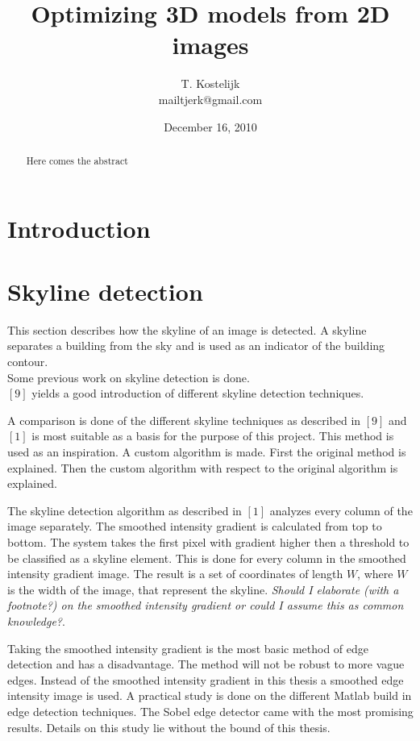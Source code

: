 \documentclass[10pt]{article}
\title{\sc Optimizing 3D models from 2D images}
\author{T. Kostelijk\\mailtjerk@gmail.com}
\date{December 16, 2010}
\begin{document}
\maketitle
\begin{abstract}
Here comes the abstract
\end{abstract}

\section{Introduction}

\section{Skyline detection}
This section describes how the skyline of an image is detected. A skyline
separates a building from the sky and is used as an indicator of the building contour.
\\

Some previous work on skyline detection is done.\\
$[9]$ yields a good introduction of different skyline detection techniques.

A comparison is done of the different skyline techniques as described in $[9]$
and $[1]$ is most suitable as a basis for the purpose of this project.  This
method is used as an inspiration. A custom algorithm is made. First
the original method is explained. Then the custom algorithm with respect to the
original algorithm is explained.

The skyline detection algorithm as described in $[1]$ analyzes every column of
the image separately.  The smoothed intensity gradient is calculated from top
to bottom.  The system takes the first pixel with gradient higher then a threshold to be
classified as a skyline element.  This is done for every column in the smoothed
intensity gradient image. The result is a set of coordinates of length $W$,
where $W$ is the width of the image, that represent the skyline.
\textit{Should I elaborate (with a footnote?) on the smoothed
intensity gradient or could I assume this as common knowledge?}. 

Taking the smoothed intensity gradient is the most basic method of edge detection
and has a disadvantage. The method will not be robust to more vague edges.
Instead of the smoothed intensity gradient in this thesis a smoothed edge intensity image is
used.  A practical study is done on the different Matlab build in edge
detection techniques. The Sobel edge detector came with the most promising
results.  Details on this study lie without the bound of this thesis.\\
\end{document}

